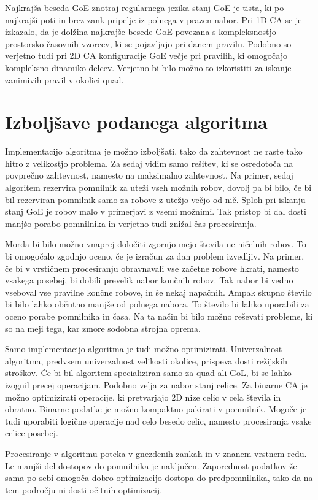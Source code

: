 \documentclass[12pt,a4paper,openany,twoside]{book}
\begin{document}
Najkrajša beseda GoE znotraj regularnega jezika stanj GoE je tista,
ki po najkrajši poti in brez zank pripelje iz polnega v prazen nabor.
Pri 1D CA se je izkazalo, da je dolžina najkrajše besede GoE povezana s kompleksnostjo
prostorsko-časovnih vzorcev, ki se pojavljajo pri danem pravilu.
Podobno so verjetno tudi pri 2D CA konfiguracije GoE večje pri pravilih,
ki omogočajo kompleksno dinamiko delcev. Verjetno bi bilo možno to izkoristiti
za iskanje zanimivih pravil v okolici quad.

\section{Izboljšave podanega algoritma}

Implementacijo algoritma je možno izboljšati, tako da zahtevnost
ne raste tako hitro z velikostjo problema.
Za sedaj vidim samo rešitev, ki se osredotoča na povprečno zahtevnost, namesto na maksimalno zahtevnost.
Na primer, sedaj algoritem rezervira pomnilnik za uteži vseh možnih robov,
dovolj pa bi bilo, če bi bil rezerviran pomnilnik samo za robove z utežjo večjo od nič.
Sploh pri iskanju stanj GoE je robov malo v primerjavi z vsemi možnimi.
Tak pristop bi dal dosti manjšo porabo pomnilnika
in verjetno tudi znižal čas procesiranja.

Morda bi bilo možno vnaprej določiti zgornjo mejo števila ne-ničelnih robov.
To bi omogočalo zgodnjo oceno, če je izračun za dan problem izvedljiv.
Na primer, če bi v vrstičnem procesiranju obravnavali vse začetne robove hkrati,
namesto vsakega posebej, bi dobili prevelik nabor končnih robov.
Tak nabor bi vedno vseboval vse pravilne končne robove, in še nekaj napačnih.
Ampak skupno število bi bilo lahko občutno manjše od polnega nabora.
To število bi lahko uporabili za oceno porabe pomnilnika in časa.
Na ta način bi bilo možno reševati probleme, ki so na meji tega,
kar zmore sodobna strojna oprema.

Samo implementacijo algoritma je tudi možno optimizirati.
Univerzalnost algoritma, predvsem univerzalnost velikosti okolice,
prispeva dosti režijskih stroškov. Če bi bil algoritem specializiran
samo za quad ali GoL, bi se lahko izognil precej operacijam.
Podobno velja za nabor stanj celice. Za binarne CA je možno optimizirati
operacije, ki pretvarjajo 2D nize celic v cela števila in obratno.
Binarne podatke je možno kompaktno pakirati v pomnilnik.
Mogoče je tudi uporabiti logične operacije nad celo besedo celic,
namesto procesiranja vsake celice posebej.

Procesiranje v algoritmu poteka v gnezdenih zankah in v znanem vrstnem redu.
Le manjši del dostopov do pomnilnika je naključen.
Zaporednost podatkov že sama po sebi omogoča dobro optimizacijo dostopa do predpomnilnika,
tako da na tem področju ni dosti očitnih optimizacij.
\end{document}
